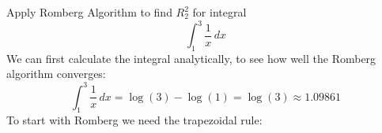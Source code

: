 \begin{example}
    Apply Romberg Algorithm to find $R_2^2$ for integral
    \[ \int_1^3 \frac{1}{x} \,dx \]
    We can first calculate the integral analytically, to see how well the Romberg algorithm converges:
    \[
        \int_1^3 \frac{1}{x} \,dx = \log(3) - \log(1) = \log(3) \approx 1.09861
    \]
    To start with Romberg we need the trapezoidal rule:
    \begin{center}
\end{center}
\end{example}

